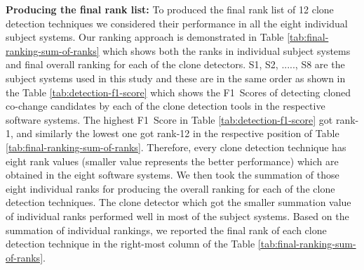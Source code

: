 \documentclass[review]{elsarticle}
\begin{document}
\textbf{Producing the final rank list:} To produced the final rank list of 12 clone detection techniques we considered their performance in all the eight individual subject systems. Our ranking approach is demonstrated in Table \ref{tab:final-ranking-sum-of-ranks} which shows both the ranks in individual subject systems and final overall ranking for each of the clone detectors. S1, S2, ....., S8 are the subject systems used in this study and these are in the same order as shown in the Table \ref{tab:detection-f1-score} which shows the F1~Scores of detecting cloned co-change candidates by each of the clone detection tools in the respective software systems. The highest F1~Score in Table \ref{tab:detection-f1-score} got rank-1, and similarly the lowest one got rank-12 in the respective position of Table \ref{tab:final-ranking-sum-of-ranks}. Therefore, every clone detection technique has eight rank values (smaller value represents the better performance) which are obtained in the eight software systems. We then took the summation of those eight individual ranks for producing the overall ranking for each of the clone detection techniques. The clone detector which got the smaller summation value of individual ranks performed well in most of the subject systems. Based on the summation of individual rankings, we reported the final rank of each clone detection technique in the right-most column of the Table \ref{tab:final-ranking-sum-of-ranks}. 
\end{document}
